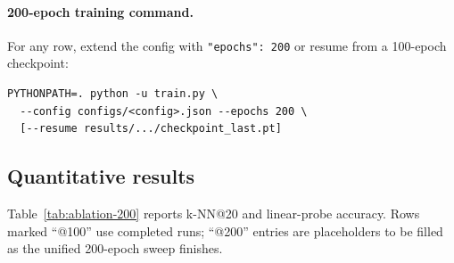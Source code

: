 \paragraph{200-epoch training command.}
For any row, extend the config with \texttt{"epochs": 200} or resume from a
100-epoch checkpoint:
\begin{verbatim}
PYTHONPATH=. python -u train.py \
  --config configs/<config>.json --epochs 200 \
  [--resume results/.../checkpoint_last.pt]
\end{verbatim}

\subsection{Quantitative results}
\label{sec:ablation-results}

Table~\ref{tab:ablation-200} reports k-NN@20 and linear-probe accuracy.
Rows marked ``@100'' use completed runs; ``@200'' entries are placeholders
to be filled as the unified 200-epoch sweep finishes.

